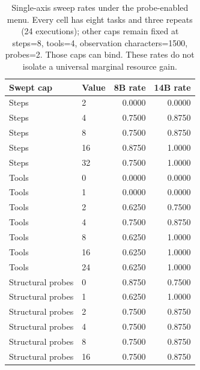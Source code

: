 \begin{table}[H]
\centering\small
\caption{Single-axis sweep rates under the probe-enabled menu. Every cell has eight tasks and three repeats (24 executions); other caps remain fixed at steps=8, tools=4, observation characters=1500, probes=2. Those caps can bind. These rates do not isolate a universal marginal resource gain.}
\label{tab:axis}
\begin{tabular}{llrr}
\toprule
Swept cap & Value & 8B rate & 14B rate \\
\midrule
Steps & 2 & 0.0000 & 0.0000 \\
Steps & 4 & 0.7500 & 0.8750 \\
Steps & 8 & 0.7500 & 0.8750 \\
Steps & 16 & 0.8750 & 1.0000 \\
Steps & 32 & 0.7500 & 1.0000 \\
Tools & 0 & 0.0000 & 0.0000 \\
Tools & 1 & 0.0000 & 0.0000 \\
Tools & 2 & 0.6250 & 0.7500 \\
Tools & 4 & 0.7500 & 0.8750 \\
Tools & 8 & 0.6250 & 1.0000 \\
Tools & 16 & 0.6250 & 1.0000 \\
Tools & 24 & 0.6250 & 1.0000 \\
Structural probes & 0 & 0.8750 & 0.7500 \\
Structural probes & 1 & 0.6250 & 1.0000 \\
Structural probes & 2 & 0.7500 & 0.8750 \\
Structural probes & 4 & 0.7500 & 0.8750 \\
Structural probes & 8 & 0.7500 & 0.8750 \\
Structural probes & 16 & 0.7500 & 0.8750 \\
\bottomrule
\end{tabular}
\end{table}
